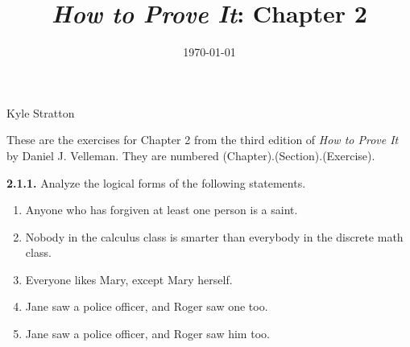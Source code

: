 \documentclass[12pt]{amsart}
\title{\emph{How to Prove It}: Chapter 2} %
\date{\today}
\newenvironment{statement}[1]{\smallskip\noindent\color[rgb]{.6627, .3529, .6314} {\bf #1.}}{}
\theoremstyle{definition}
\theoremstyle{remark}
\begin{document}
\maketitle

\vspace*{-0.25in}
\centerline{Kyle Stratton}

\begin{framed}
These are the exercises for Chapter 2 from the third edition of \emph{How to Prove It} by Daniel J. Velleman.
They are numbered (Chapter).(Section).(Exercise).
\end{framed}

\begin{statement}{2.1.1}
Analyze the logical forms of the following statements.
\begin{enumerate}
	\item Anyone who has forgiven at least one person is a saint.
	
	\item Nobody in the calculus class is smarter than everybody in the discrete math class.
	
	\item Everyone likes Mary, except Mary herself.
	
	\item Jane saw a police officer, and Roger saw one too.
	
	\item Jane saw a police officer, and Roger saw him too.
\end{enumerate}
\end{statement}
\end{document}
